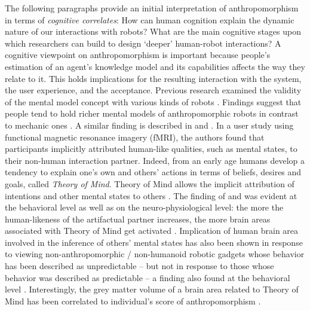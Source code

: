 \documentclass{frontiersSCNS} %
\begin{document}
The following paragraphs provide an initial interpretation of anthropomorphism in terms of \textit{cognitive correlates}: How can human cognition explain the dynamic nature of our interactions with robots? What are the main cognitive stages upon which researchers can build to design `deeper' human-robot interactions?
A cognitive viewpoint on anthropomorphism is important because people's
estimation of an agent's knowledge model and its capabilities affects the way
they relate to it. This holds implications for the resulting interaction with
the system, the user experience, and the acceptance. Previous research examined
the validity of the mental model concept with various kinds of robots
\citep{schmitz_concepts_2011,kiesler_mental_2002}. Findings suggest that people
tend to hold richer mental models of anthropomorphic robots in contrast to
mechanic ones \citep{kiesler_mental_2002}.
A similar finding is described in
\cite{hegel_understanding_2008} and \cite{krach_can_2008}. In a user study using
functional magnetic resonance imagery (fMRI), the authors found that
participants implicitly attributed human-like qualities, such as mental states,
to their non-human interaction partner. Indeed, from an early age humans develop
a tendency to explain one's own and others' actions in terms of beliefs, desires
and goals, called \textit{Theory of Mind}. Theory of Mind allows the
implicit attribution of intentions and other mental states to others
\citep{premack1978does,leslie_pretense_1987,Frith2003}. The finding of
\cite{hegel_understanding_2008} and \cite{krach_can_2008} was evident at the
behavioral level as well as on the neuro-physiological level: the more the
human-likeness of the artifactual partner increases, the more brain areas
associated with Theory of Mind get activated \citep{krach_can_2008}.
Implication of human brain area involved in the inference of others' mental
states has also been shown in response to viewing
non-anthropomorphic / non-humanoid robotic gadgets whose behavior has been
described as unpredictable -- but not in response to those whose behavior was
described as predictable -- a finding also found at the behavioral level
\citep{Waytz2010}. Interestingly, the grey matter volume of a brain area
related to Theory of Mind has been correlated to individual's score of
anthropomorphism \citep{cullen2013individual}.
\end{document}
